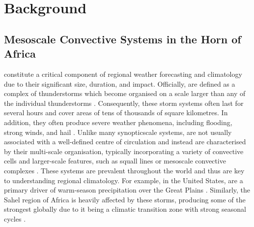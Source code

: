 \chapter{Background}
\label{ch:background}

\section{Mesoscale Convective Systems in the Horn of Africa}

 constitute a critical component of regional weather forecasting and climatology due to their significant size, duration, and impact. Officially,  are defined as a complex of thunderstorms which become organised on a scale larger than any of the individual thunderstorms \citep{NOAANWS2025}. Consequently, these storm systems often last for several hours and cover areas of tens of thousands of square kilometres. In addition, they often produce severe weather phenomena, including flooding, strong winds, and hail \citep{Houze2014}. Unlike many \Gls{synopticscale} systems,  are not usually associated with a well-defined centre of circulation and instead are characterised by their multi-scale organisation, typically incorporating a variety of convective cells and larger-scale features, such as squall lines or mesoscale convective complexes \citep{AMS2024,NOAANWS2025}. These systems are prevalent throughout the world and thus are key to understanding regional climatology. For example, in the United States,  are a primary driver of warm-season precipitation over the Great Plains \citep{Haberlie2019}. Similarly, the Sahel region of Africa is heavily affected by these storms, producing some of the strongest  globally due to it being a climatic transition zone with strong seasonal cycles \citep{Zipser2006}.

